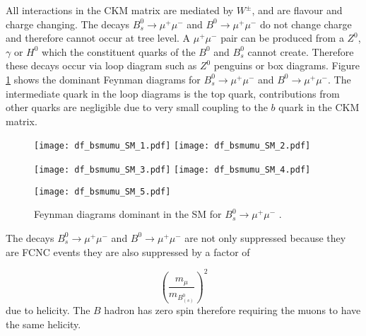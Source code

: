 All interactions in the CKM matrix are mediated by $W^{\pm}$, and are flavour and charge changing. The decays $B_{s}^{0} \to \mu^{+} \mu^{-}$ and $B^{0} \to \mu^{+} \mu^{-}$ do not 
change charge and therefore cannot occur at tree level. A $\mu^{+} \mu^{-}$ pair can be produced from a  $Z^{0}$, $\gamma$ or $H^{0}$ which the constituent quarks
of the $B^{0}$ and $B^{0}_{s}$ cannot create. Therefore these decays occur via loop diagram such as $Z^{0}$ penguins or box diagrams. Figure \ref{diagrams} shows the dominant
Feynman diagrams for $B_{s}^{0} \to \mu^{+} \mu^{-}$ and $B^{0} \to \mu^{+} \mu^{-}$. The intermediate quark in the loop diagrams is the top quark, contributions from other quarks 
are negligible due to very small coupling to the $b$ quark in the CKM matrix.


\begin{figure}
\begin{center}
\begin{minipage}[b]{0.9\linewidth}
\texttt{[image: df\_bsmumu\_SM\_1.pdf]}
\hspace{0.1\linewidth}
\texttt{[image: df\_bsmumu\_SM\_2.pdf]}
\end{minipage}
\hspace{1cm}
\begin{minipage}[b]{0.9\linewidth}
\texttt{[image: df\_bsmumu\_SM\_3.pdf]}
\hspace{0.1\linewidth}
\texttt{[image: df\_bsmumu\_SM\_4.pdf]}
\end{minipage}
\hspace{1cm}
\texttt{[image: df\_bsmumu\_SM\_5.pdf]}
\end{center}
\caption{Feynman diagrams dominant in the SM for $B_{s}^{0} \to \mu^{+} \mu^{-}$ \cite{Bettler:1257978}.}
\label{diagrams}

\end{figure}  
The decays $B_{s}^{0} \to \mu^{+} \mu^{-}$ and $B^{0} \to \mu^{+} \mu^{-}$ are not only suppressed because they are FCNC events they are also suppressed by a 
factor of

$$\left(\frac{m_{\mu}}{m_{B_{(s)}^{0}}}\right)^2$$
due to helicity. The $B$ hadron has zero spin therefore requiring the muons to have the same helicity.





